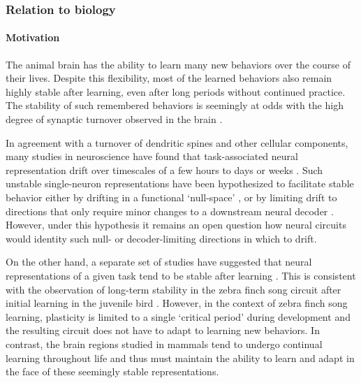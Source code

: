 \subsubsection{Relation to biology}

\paragraph{Motivation}

The animal brain has the ability to learn many new behaviors over the course of their lives.
Despite this flexibility, most of the learned behaviors also remain highly stable after learning, even after long periods without continued practice.
The stability of such remembered behaviors is seemingly at odds with the high degree of synaptic turnover observed in the brain \citep{holtmaat2009experience,xu2009rapid,yang2009stably}.

In agreement with a turnover of dendritic spines and other cellular components, many studies in neuroscience have found that task-associated neural representation drift over timescales of a few hours to days or weeks \citep{rokni2007motor,carmena2005stable,driscoll2017dynamic,schoonover2020representational}.
Such unstable single-neuron representations have been hypothesized to facilitate stable behavior either by drifting in a functional `null-space' \citep{gallego2020long}, or by limiting drift to directions that only require minor changes to a downstream neural decoder \citep{rule2020stable}.
However, under this hypothesis it remains an open question how neural circuits would identity such null- or decoder-limiting directions in which to drift.

On the other hand, a separate set of studies have suggested that neural representations of a given task tend to be stable after learning \citep{chestek2007single,flint2016long,dhawale2017automated}.
This is consistent with the observation of long-term stability in the zebra finch song circuit after initial learning in the juvenile bird \citep{katlowitz2018stable}.
However, in the context of zebra finch song learning, plasticity is limited to a single `critical period' during development \citep{sizemore2011premotor} and the resulting circuit does not have to adapt to learning new behaviors.
In contrast, the brain regions studied in mammals tend to undergo continual learning throughout life and thus must maintain the ability to learn and adapt in the face of these seemingly stable representations.

